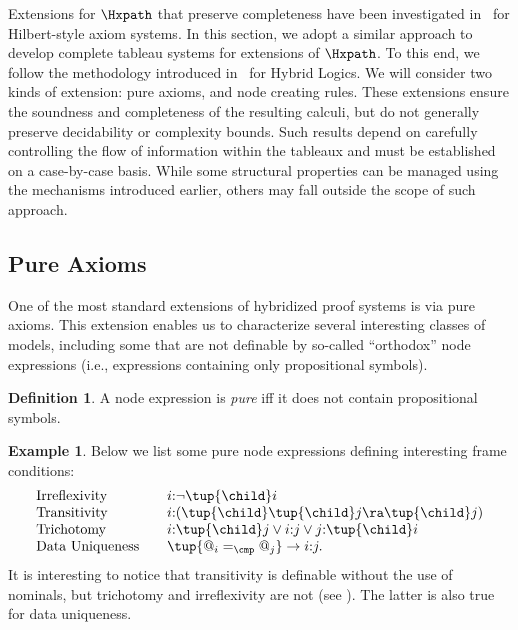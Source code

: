 \documentclass[10pt,a4paper]{amsart}
\theoremstyle{definition}
\newtheorem{defi}[thm]{Definition}
\newtheorem{exa}[thm]{Example}
\theoremstyle{remark}
\begin{document}
Extensions for $\Hxpath$ that preserve completeness have been investigated in~\cite{ArecesF21} for Hilbert-style axiom systems. In this section, we adopt a similar approach to develop complete tableau systems for extensions of $\Hxpath$. To this end, we follow the methodology introduced in~\cite{Blackburn00,Blackburn2002BeyondPA,BtC06} for Hybrid Logics. We will consider two kinds of extension: pure axioms, and node creating rules.  These extensions ensure the soundness and completeness of the resulting calculi, but do not generally preserve decidability or complexity bounds. Such results depend on carefully controlling the flow of information within the tableaux and must be established on a case-by-case basis. While some structural properties can be managed using the mechanisms introduced earlier, others may fall outside the scope of such approach.

\subsection{Pure Axioms} 
One of the most standard extensions of hybridized proof systems is via pure axioms. This extension enables us to characterize several interesting classes of models, including some that are not definable by so-called ``orthodox'' node expressions (i.e., expressions containing only propositional symbols). 

\begin{defi}\label{def:pure}
    A node expression is \emph{pure} iff it does not contain propositional symbols.
\end{defi}

\begin{exa}\label{ex:pure}
 Below we list some pure node expressions defining interesting frame conditions:
 \[
 \begin{array}{l@{\quad\quad}l}
    \text{Irreflexivity}  &  i{:}\neg \tup{\child} i \\
    \text{Transitivity} &  i{:}(\tup{\child}\tup{\child}j \ra \tup{\child}j) \\
    \text{Trichotomy} & i{:}\tup{\child} j \lor i{:}j \lor j{:}\tup{\child}i\\
    \text{Data Uniqueness} & \tup{@_i =_\cmp @_j} \to i{:} j .
 \end{array}
 \]
 It is interesting to notice that transitivity is definable without the use of nominals,  but trichotomy and irreflexivity are not (see \cite{Blackburn00}). The latter is also true for data uniqueness.
\end{exa}
\end{document}
